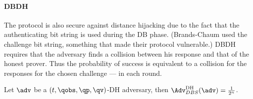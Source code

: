 \paragraph{\Acl{DBDH}}

The protocol is also secure against distance hijacking due to the fact that the 
authenticating bit string is used during the \ac{DB} phase.
(Brands-Chaum used the challenge bit string, something that made their protocol 
vulnerable.)
\Ac{DBDH} requires that the adversary finds a collision between his response 
and that of the honest prover.
Thus the probability of success is equivalent to a collision for the responses 
for the chosen challenge --- in each round.

\begin{theorem}
  Let \(\adv\) be a \((t, \qobs, \qp, \qv)\)-DH adversary, then 
  \(\Adv_{DBS}^{\text{DH}}(\adv) = \frac{1}{2^n}\).
\end{theorem}

